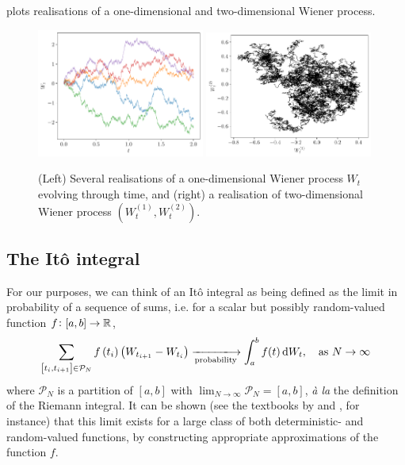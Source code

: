  plots realisations of a one-dimensional and two-dimensional Wiener process.

\begin{figure}
	\begin{center}
		\includegraphics[width=0.49\textwidth]{figures/wiener_realisations_1d.pdf}
		\includegraphics[width=0.49\textwidth]{figures/wiener_realisations_2d.pdf}
		\caption{(Left) Several realisations of a one-dimensional Wiener process \(W_t\) evolving through time, and (right) a realisation of two-dimensional Wiener process \(\left(W_t^{(1)}, W_t^{(2)}\right)\).}
		\label{fig:wiener_rels}
	\end{center}
\end{figure}


\subsection{The It\^o integral}\label{sec:bkg_ito}
For our purposes, we can think of an It\^o integral as being defined as the limit in probability of a sequence of sums, i.e. for a scalar but possibly random-valued function \(f\colon [a,b] \to \mathbb{R}\),
\begin{equation}\label{eqn:ito_int_limit_defn}
	\sum_{\left[t_i, t_{i+1}\right] \in \mathcal{P}_N}{f\left(t_{i}\right)\left(W_{t_{i+1}} - W_{t_i}\right)} \xlongrightarrow[\text{probability}]{} \int_a^b{f(t)\dif W_t}, \quad \text{as } N \to \infty
\end{equation}
where \(\mathcal{P}_N\) is a partition of \(\left[a,b\right]\) with \(\lim_{N \to \infty}\mathcal{P}_N = [a,b]\), \emph{\`a la} the definition of the Riemann integral.
It can be shown (see the textbooks by \citet{KallianpurSundar_2014_StochasticAnalysisDiffusion} and \citet{Oksendal_2003_StochasticDifferentialEquations}, for instance) that this limit exists for a large class of both deterministic- and random-valued functions, by constructing appropriate approximations of the function \(f\).

